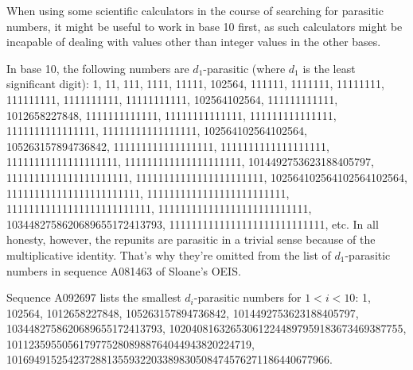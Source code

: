 \documentclass[12pt]{article}
\begin{document}
When using some scientific calculators in the course of searching for parasitic numbers, it might be useful to work in base 10 first, as such calculators might be incapable of dealing with values other than integer values in the other bases.

In base 10, the following numbers are $d_1$-parasitic (where $d_1$ is the least significant digit): 1, 11, 111, 1111, 11111, 102564, 111111,  1111111, 11111111, 111111111, 1111111111, 11111111111, 102564102564, 111111111111,
1012658227848, 1111111111111, 11111111111111, 111111111111111, 1111111111111111, 11111111111111111, 102564102564102564, 105263157894736842,
111111111111111111, 1111111111111111111, 11111111111111111111,
111111111111111111111, 1014492753623188405797, 1111111111111111111111,
11111111111111111111111, 102564102564102564102564, 111111111111111111111111,
1111111111111111111111111, 11111111111111111111111111, 
111111111111111111111111111, 1034482758620689655172413793,
1111111111111111111111111111, etc. In all honesty, however, the repunits are parasitic in a trivial sense because of the multiplicative identity. That's why they're omitted from the list of $d_1$-parasitic numbers in sequence A081463 of Sloane's OEIS.

Sequence A092697 lists the smallest $d_i$-parasitic numbers for $1 < i < 10$: 1, 102564, 1012658227848, 105263157894736842, 1014492753623188405797, 1034482758620689655172413793, 102040816326530612244897959183673469387755, 10112359550561797752808988764044943820224719, 1016949152542372881355932203389830508474576271186440677966.



\end{document}
